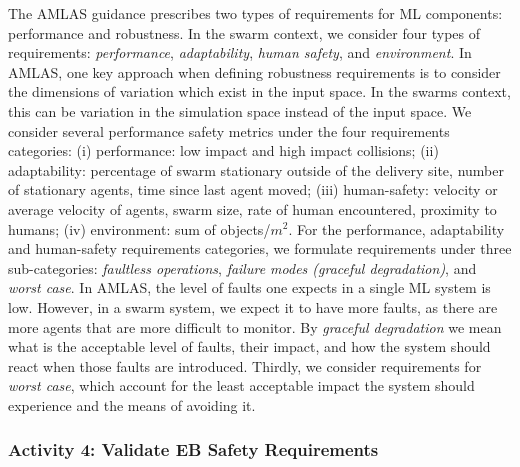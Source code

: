 \documentclass[runningheads]{llncs}
\begin{document}
The AMLAS guidance prescribes two types of requirements for ML components: performance and robustness. 
In the swarm context, we consider four types of requirements: \emph{performance}, \emph{adaptability}, \emph{human safety}, and \emph{environment}.
In AMLAS, one key approach when defining robustness requirements is to consider the dimensions of variation which exist in the input space. In the swarms context, this can be variation in the simulation space instead of the input space. 
We consider several performance safety metrics under the four requirements categories: 
(i) performance: low impact and high impact collisions; 
(ii) adaptability: percentage of swarm stationary outside of the delivery site, number of stationary agents, time since last agent moved; 
(iii) human-safety: velocity or average velocity of agents, swarm size, rate of human encountered, proximity to humans;
(iv) environment: sum of objects/$m^2$. 
For the performance, adaptability and human-safety requirements categories, we formulate requirements under three sub-categories: \emph{faultless operations}, \emph{failure modes (graceful degradation)}, and \emph{worst case}. 
In AMLAS, the level of faults one expects in a single ML system is low. However, in a swarm system, we expect it to have more faults, as there are more agents that are more difficult to monitor. 
By \emph{graceful degradation} we mean what is the acceptable level of faults, their impact, and how the system should react when those faults are introduced. 
Thirdly, we consider requirements for \emph{worst case}, which account for the least acceptable impact the system should experience and the means of avoiding it. 

\vspace{-2ex}
\subsubsection*{Activity 4: Validate EB Safety Requirements}
\end{document}

